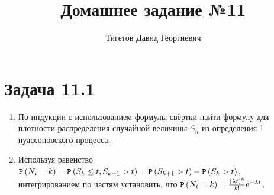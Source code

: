 \documentclass[12pt]{article}
\begin{document}
    \title{Домашнее задание №11}
    \author{Тигетов Давид Георгиевич}
    \date{}
    \maketitle

    \section*{Задача 11.1}
    \begin{enumerate}
        \item По индукции с использованием формулы свёртки найти формулу для плотности распределения случайной величины $S_n$ из определения 1 пуассоновского процесса.
        \item Используя равенство $\mathtt{P} \left ( N_t = k \right ) = \mathtt{P} \left ( S_k \le t, S_{k+1} > t \right ) = \mathtt{P} \left ( S_{k+1} > t \right ) - \mathtt{P} \left ( S_k > t \right )$, интегрированием по частям установить,
        что $\mathtt{P} \left ( N_t = k \right ) = \frac{(\lambda t)^k}{k!} e^{-\lambda t}$.
    \end{enumerate}
\end{document}

